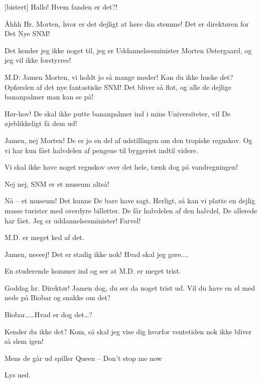 \documentclass[a4paper,12pt]{article}
\begin{document}
\begin{sketch}
[bistert] Hallo! Hvem fanden er det?!

 Åhhh Hr. Morten, hvor er det dejligt at høre din stemme! Det er direktøren for Det Nye SNM!

Det kender jeg ikke noget til, jeg er Uddannelsesminister Morten Østergaard, og jeg vil ikke forstyrres!

M.D: Jamen Morten, vi holdt jo så mange møder! Kan du ikke huske det? Opførslen af det nye fantastiske SNM! Det bliver så flot,  og alle de dejlige bananpalmer man kan se på!

Hør-hov! De skal ikke putte bananpalmer ind i mine Universiteter, vil De øjeblikkeligt få dem ud!

 Jamen, nej Morten! De er jo en del af udstillingen om den tropiske regnskov. Og vi har kun fået halvdelen af pengene til byggeriet indtil videre.

Vi skal ikke have noget regnskov over det hele, tænk dog på vandregningen!
 
 Nej nej, SNM er et museum altså!

Nå -- et museum! Det kunne De bare have sagt. Herligt, så kan vi platte en dejlig masse turister med overdyre billetter. De får halvdelen af den halvdel, De allerede har fået. Jeg er uddannelsesminister! Farvel!


\scene M.D. er meget ked af det.

 Jamen, neeeej! Det er stadig ikke nok! Hvad skal jeg gøre....


\scene En studerende kommer ind og ser at M.D. er meget trist.

 Goddag hr. Direktør! Jamen dog, du ser da noget trist ud. Vil du have en øl med nede på Biobar og snakke om det?

 Biobar\ldots {}\ldots Hvad er dog det\ldots ?

 Kender du ikke det? Kom, så skal jeg vise dig hvorfor ventetiden nok ikke bliver så slem igen! 

\scene Mens de går ud spiller Queen -- Don't stop me now

Lys ned.


\end{sketch}
\end{document}

